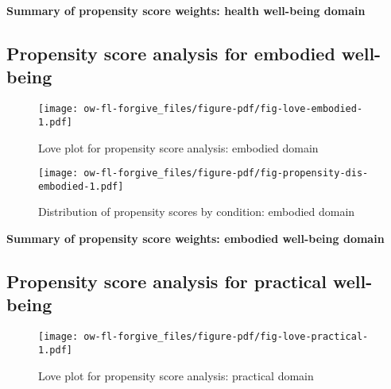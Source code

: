 \documentclass[
  singlecolumn]{report}
\begin{document}
\textbf{Summary of propensity score weights: health well-being domain}

\hypertarget{propensity-score-analysis-for-embodied-well-being}{%
\subsection{Propensity score analysis for embodied
well-being}\label{propensity-score-analysis-for-embodied-well-being}}

\begin{figure}

{\centering \texttt{[image: ow-fl-forgive\_files/figure-pdf/fig-love-embodied-1.pdf]}

}

\caption{\label{fig-love-embodied}Love plot for propensity score
analysis: embodied domain}

\end{figure}

\begin{figure}

{\centering \texttt{[image: ow-fl-forgive\_files/figure-pdf/fig-propensity-dis-embodied-1.pdf]}

}

\caption{\label{fig-propensity-dis-embodied}Distribution of propensity
scores by condition: embodied domain}

\end{figure}

\textbf{Summary of propensity score weights: embodied well-being domain}

\hypertarget{propensity-score-analysis-for-practical-well-being}{%
\subsection{Propensity score analysis for practical
well-being}\label{propensity-score-analysis-for-practical-well-being}}

\begin{figure}

{\centering \texttt{[image: ow-fl-forgive\_files/figure-pdf/fig-love-practical-1.pdf]}

}

\caption{\label{fig-love-practical}Love plot for propensity score
analysis: practical domain}

\end{figure}
\end{document}
